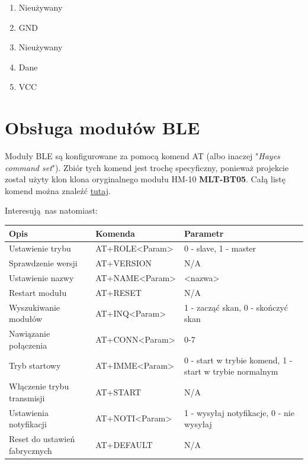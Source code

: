 \documentclass[eng,printmode]{mgr}
\begin{document}
\begin{enumerate}
\item Nieużywany
\item GND
\item Nieużywany
\item Dane
\item VCC
\end{enumerate}

\newpage
\section{Obsługa modułów BLE}

Moduły BLE są konfigurowane za pomocą komend AT (albo inaczej "\textit{Hayes command set}"). Zbiór tych komend jest trochę specyficzny, ponieważ projekcie został użyty klon klona oryginalnego modułu HM-10 \textbf{MLT-BT05}.
Całą listę komend można znaleźć \href{http://denethor.wlu.ca/arduino/MLT-BT05-AT-commands-TRANSLATED.pdf}{tutaj}.

Interesują nas natomiast:

\begin{table}[htb]
\begin{tabular}{|l|l|p{6cm}|}
\hline
\textbf{Opis}    &  \textbf{Komenda} & \textbf{Parametr}  \\ \hline
Ustawienie trybu                   &  AT+ROLE<Param>          &  0 - slave, 1 - master  	   \\ \hline
Sprawdzenie wersji                    &  AT+VERSION           &  N/A       \\ \hline
Ustawienie nazwy    &  AT+NAME<Param>              &  <nazwa>     \\ \hline
Restart modułu             &  AT+RESET            & N/A      \\ \hline
Wyszukiwanie modułów             &  AT+INQ<Param>        &  1 - zacząć skan, 0 - skończyć skan                   \\ \hline
Nawiązanie połączenia           &  AT+CONN<Param>                    &  0-7                   \\ \hline
Tryb startowy                 &  AT+IMME<Param>                    &  0 - start w trybie komend, 1 - start w trybie normalnym                    \\ \hline
Włączenie trybu transmisji                 &  AT+START                    &  N/A                    \\ \hline
Ustawienia notyfikacji                 &  AT+NOTI<Param>                    &  1 - wysyłaj notyfikacje, 0 - nie wysyłaj                    \\ \hline
Reset do ustawień fabrycznych                 &  AT+DEFAULT                    &  N/A                    \\ \hline
\end{tabular}
\end{table}
\end{document}
